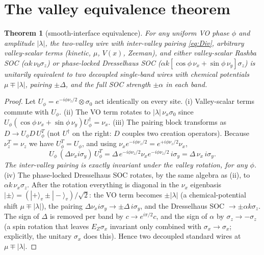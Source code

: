 \documentclass[11pt]{article}
\newcommand{\nx}{\nu_x}\newcommand{\ny}{\nu_y}\newcommand{\nz}{\nu_z}
\newtheorem{theorem}{Theorem}
\begin{document}
\section{The valley equivalence theorem}\label{s:theorem}
\begin{theorem}[smooth-interface equivalence]\label{th:equiv}
For any \emph{uniform} VO phase $\phi$ and amplitude $|\lambda|$, the
two-valley wire with inter-valley pairing \eqref{eq:Div}, arbitrary
valley-scalar terms (kinetic, $\mu$, $V(x)$, Zeeman), and either
valley-scalar Rashba SOC ($\alpha k\,\nu_0\sigma_z$) or phase-locked
Dresselhaus SOC ($\alpha k[\cos\phi\,\nx+\sin\phi\,\ny]\sigma_z$) is
unitarily equivalent to two \emph{decoupled} single-band wires with
chemical potentials $\mu \mp |\lambda|$, pairing $\pm\Delta$, and the full
SOC strength $\pm\alpha$ in each band.
\end{theorem}

\begin{proof}
Let $U_\phi = e^{-i\phi\nz/2}\otimes\sigma_0$ act identically on every site.
(i) Valley-scalar terms commute with $U_\phi$.
(ii) The VO term rotates to $|\lambda|\,\nx\sigma_0$ since
$U_\phi(\cos\phi\,\nx+\sin\phi\,\ny)U_\phi^\dagger = \nx$.
(iii) The pairing block transforms as $D \to U_\phi D\, U_\phi^{T}$ (not
$U^\dagger$ on the right: $D$ couples two creation operators). Because
$\nz^T = \nz$ we have $U_\phi^T = U_\phi$, and using
$\nx e^{-i\phi\nz/2} = e^{+i\phi\nz/2}\nx$,
\begin{equation}
U_\phi\,(\Delta \nx i\sigma_y)\,U_\phi^{T}
= \Delta\, e^{-i\phi\nz/2} \nx e^{-i\phi\nz/2}\, i\sigma_y
= \Delta\, \nx\, i\sigma_y .
\label{eq:Dinv}
\end{equation}
\emph{The inter-valley pairing is exactly invariant under the valley
rotation, for any $\phi$.}
(iv) The phase-locked Dresselhaus SOC rotates, by the same algebra as (ii),
to $\alpha k\,\nx\sigma_z$.
After the rotation everything is diagonal in the $\nx$ eigenbasis
$|\pm\rangle = (|+\rangle_v \pm |-\rangle_v)/\sqrt2$: the VO term becomes
$\pm|\lambda|$ (a chemical-potential shift $\mu \mp |\lambda|$), the pairing
$\Delta\nx i\sigma_y \to \pm\Delta\, i\sigma_y$, and the Dresselhaus SOC
$\to \pm\alpha k \sigma_z$. The sign of $\Delta$ is removed per band by
$c\to e^{i\pi/2}c$, and the sign of $\alpha$ by $\sigma_z\to-\sigma_z$
(a spin rotation that leaves $E_Z\sigma_x$ invariant only combined with
$\sigma_x\to\sigma_x$; explicitly, the unitary $\sigma_x$ does this). Hence
two decoupled standard wires at $\mu\mp|\lambda|$.
\end{proof}
\end{document}
